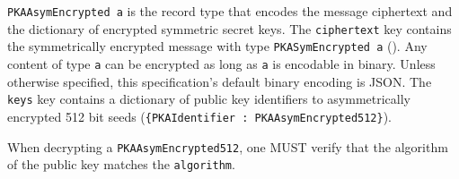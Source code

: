 \documentclass{article}
\begin{document}
\texttt{PKAAsymEncrypted a} is the record type that encodes the message ciphertext and the dictionary of encrypted symmetric secret keys. 
The \texttt{ciphertext} key contains the symmetrically encrypted message with type \texttt{PKASymEncrypted a} (). 
Any content of type \texttt{a} can be encrypted as long as \texttt{a} is encodable in binary. 
Unless otherwise specified, this specification's default binary encoding is JSON. 
The \texttt{keys} key contains a dictionary of public key identifiers to asymmetrically encrypted 512 bit seeds (\texttt{\{PKAIdentifier : PKAAsymEncrypted512\}}). 

%
%
%

When decrypting a \texttt{PKAAsymEncrypted512}, one MUST verify that the algorithm of the public key matches the \texttt{algorithm}. %

%
%
%
%
\end{document}
